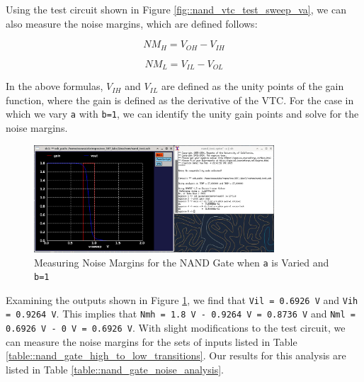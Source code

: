 \documentclass[fleqn]{article}
\begin{document}
	Using the test circuit shown in Figure \ref{fig::nand_vtc_test_sweep_va}, we can also measure the noise margins, which are defined follows:
	
	\begin{equation}
		NM_H = V_{OH} - V_{IH}
		\label{eq::noise_margin_high}
	\end{equation}
	
	\begin{equation}
		NM_L = V_{IL} - V_{OL}
		\label{eq::noise_margin_low}
	\end{equation}
	
	In the above formulas, $V_{IH}$ and $V_{IL}$ are defined as the unity points of the gain function, where the gain is defined as the derivative of the VTC. For the case in which we vary \texttt{a} with \texttt{b=1}, we can identify the unity gain points and solve for the noise margins.
	
	\begin{figure}[H]
		\centerline{\includegraphics[width=0.8\textwidth]{nand_noise_analysis_sweep_va.png}}
		\caption{Measuring Noise Margins for the NAND Gate when \texttt{a} is Varied and \texttt{b=1}}	\label{fig::nand_noise_analysis_sweep_va}
	\end{figure}
	
	Examining the outputs shown in Figure \ref{fig::nand_noise_analysis_sweep_va}, we find that \texttt{Vil = 0.6926 V} and \texttt{Vih = 0.9264 V}. This implies that \texttt{Nmh = 1.8 V - 0.9264 V = 0.8736 V} and \texttt{Nml = 0.6926 V - 0 V = 0.6926 V}. With slight modifications to the test circuit, we can measure the noise margins for the sets of inputs listed in Table \ref{table::nand_gate_high_to_low_transitions}. Our results for this analysis are listed in Table \ref{table::nand_gate_noise_analysis}.
	
\end{document}
